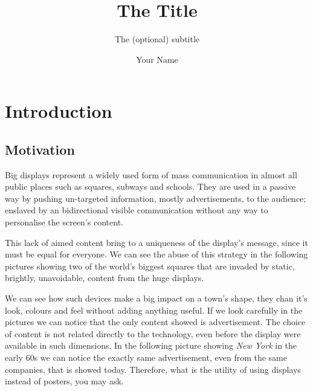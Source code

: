 \documentclass[]{usiinfbachelorproject}
\author{Your Name}
\title{The Title}
\subtitle{The (optional) subtitle}
\begin{document}
\maketitle

\section{Introduction}
\subsection{Motivation}

Big displays represent a widely used form of mass communication in almost all public places such as squares, subways and schools. They are used in a passive way by pushing un-targeted information, mostly advertisements, to the audience; enslaved by an bidirectional visible communication without any way to personalise the screen's content.

This lack of aimed content bring to a uniqueness of the display's message, since it must be equal for everyone. We can see the abuse of this strategy in the following pictures showing two of the world's biggest squares that are invaded by static, brightly, unavoidable, content from the huge displays.
\begin{figure}[H]
  \centering
  \hfill
\end{figure} 

We can see how such devices make a big impact on a town's shape, they chan it's look, colours and feel without adding anything useful. If we look carefully in the pictures we can notice that the only content showed is advertisement. The choice of content is not related directly to the technology, even before the display were available in such dimensions. In the following picture showing \emph{New York} in the early 60s we can notice the exactly same advertisement, even from the same companies, that is showed today. Therefore, what is the utility of using displays instead of posters, you may ask.
\end{document}
